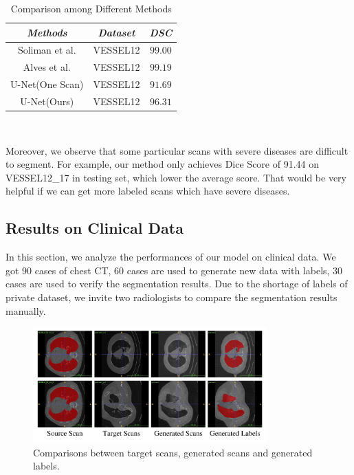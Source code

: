 \documentclass{article}
\begin{document}
\begin{table}[htbp]    
    \caption{Comparison among Different Methods}

    \begin{center}
    \begin{tabular}{c|c|c}

    \hline
    \textbf{\textit{Methods}} & \textbf{\textit{Dataset}}& \textbf{\textit{DSC}}\\
    \hline
    Soliman et al. \cite{soliman2016accurate} & VESSEL12 & $99.00$ \\
    Alves et al. \cite{alves2018extracting} & VESSEL12 & $99.19$ \\
    \hline
    U-Net(One Scan) & VESSEL12 & $91.69$ \\
    U-Net(Ours) & VESSEL12 & $96.31$ \\
    \hline

    \end{tabular}
    \vspace{-0cm}

    \end{center}

    \vspace{-0cm}\    
    \label{vesselres}
    \end{table}

Moreover, we observe that some particular scans with severe diseases are difficult to segment. For example, our method only achieves Dice Score of 91.44 on VESSEL12\_17 in testing set, which lower the average score. That would be very helpful if we can get more labeled scans which have severe diseases.


\subsection{Results on Clinical Data}
\label{subsec:clinical}
In this section, we analyze the performances of our model on clinical data. We got 90 cases of chest CT, 60 cases are used to generate new data with labels, 30 cases are used to verify the segmentation results. Due to the shortage of labels of private dataset, we invite two radiologists to compare the segmentation results manually.

\begin{figure}[t]
    \centerline{\includegraphics[width=90mm]{generatedata.pdf}}
    \vspace{-0cm}
    \caption{Comparisons between target scans, generated scans and generated labels.
    }
    \vspace{-0cm}
    \label{generatedata}
    \end{figure}
\end{document}
